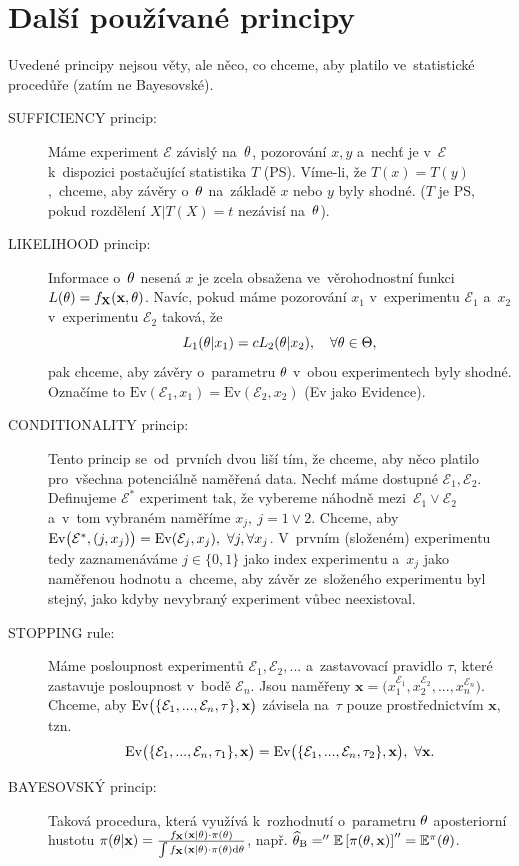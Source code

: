 \chapter{Další používané principy}
Uvedené principy nejsou věty, ale něco, co chceme, aby platilo ve~statistické procedůře (zatím ne Bayesovské).
\begin{description}
	\item[SUFFICIENCY princip:] Máme experiment $\mathcal{E}$ závislý na~$\theta$, pozorování $x,y$ a~nechť je v~$\mathcal{E}$ k~dispozici postačující statistika $T$ (PS). Víme-li, že $T(x)=T(y)$,~chceme, aby závěry o~$\theta$ na~základě $x$ nebo $y$ byly shodné. ($T$ je PS, pokud rozdělení $X|T(X)=t$ nezávisí na~$\theta$).
	
	\item[LIKELIHOOD princip:] Informace o~$\theta$ nesená $x$ je zcela obsažena ve~věrohodnostní funkci $L(\theta)=f_{\textbf{X}}(\textbf{x},\theta)$. Navíc, pokud máme pozorování $x_1$ v~experimentu $\mathcal{E}_1$ a~$x_2$ v~experimentu $\mathcal{E}_2$ taková, že 
	$$ L_1(\theta|x_1)=c L_2(\theta|x_2),\quad\forall\theta\in\Theta,$$
	pak chceme, aby závěry o~parametru $\theta$ v~obou experimentech byly shodné. Označíme to $\mathrm{Ev}(\mathcal{E}_1,x_1)=\mathrm{Ev}(\mathcal{E}_2,x_2)$ (Ev jako Evidence). 
	
	\item[CONDITIONALITY princip:] Tento princip se~od~prvních dvou liší tím, že chceme, aby něco platilo pro~všechna potenciálně naměřená data. Nechť máme dostupné $\mathcal{E}_1,\mathcal{E}_2$. Definujeme $\mathcal{E}^*$ experiment tak, že vybereme náhodně mezi~$\mathcal{E}_1 \vee \mathcal{E}_2$ a~v~tom vybraném naměříme $x_j,~j=1\vee 2$. Chceme, aby $\mathrm{Ev}\big(\mathcal{E}^*,(j,x_j)\big)=\mathrm{Ev}(\mathcal{E}_j,x_j),~\forall j,\forall x_j$. V~prvním (složeném) experimentu tedy zaznamenáváme $j\in\{0,1\}$ jako index experimentu a~$x_j$ jako naměřenou hodnotu a~chceme, aby závěr ze~složeného experimentu byl stejný, jako kdyby nevybraný experiment vůbec neexistoval.
	\item[STOPPING rule:] Máme posloupnost experimentů $\mathcal{E}_1,\mathcal{E}_2,...$ a~zastavovací pravidlo $\tau$, které zastavuje posloupnost v~bodě $\mathcal{E}_n$. Jsou naměřeny $\textbf{x}=\big( x_1^{\mathcal{E}_1},x_2^{\mathcal{E}_2},...,x_n^{\mathcal{E}_n} \big)$. Chceme, aby $\mathrm{Ev}\big( \{ \mathcal{E}_1,...,\mathcal{E}_n,\tau \},\textbf{x} \big)$ závisela na~$\tau$ pouze prostřednictvím $\textbf{x}$, tzn. $$\mathrm{Ev}\big( \{ \mathcal{E}_1,...,\mathcal{E}_n,\tau_1 \},\textbf{x} \big)=\mathrm{Ev}\big( \{ \mathcal{E}_1,...,\mathcal{E}_n,\tau_2 \},\textbf{x} \big),~\forall \textbf{x}.$$
	\item[BAYESOVSKÝ princip:] Taková procedura, která využívá k~rozhodnutí o~parametru $\theta$ aposteriorní hustotu $\pi(\theta|\textbf{x})=\frac{f_{\textbf{X}}(\textbf{x}|\theta)\cdot\pi(\theta)}{\int f_{\textbf{X}}(\textbf{x}|\theta)\cdot\pi(\theta) \mathrm{d}\theta}$, např. $\widehat{\theta}_\mathrm{B}=''\mathbb{E}\left[ \pi(\theta,\textbf{x}) \right]''=\mathbb{E}^\pi(\theta)$.
\end{description}

